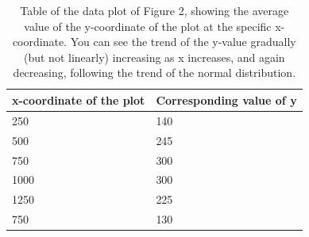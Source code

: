 \documentclass{article}
\begin{document}
\begin{table}
\centering
\begin{tabular}{ | m{2cm} || m{3cm}| } 
  \hline
  x-coordinate of the plot & Corresponding value of y \\
  \hline
  250 & 140 \\ 
  \hline
  500 & 245 \\ 
  \hline
  750 & 300 \\ 
  \hline
  1000 & 300 \\
  \hline
  1250 & 225 \\
  \hline
  750 & 130 \\
  \hline
\end{tabular}
\caption{Table of the data plot of Figure 2, showing the average value of the y-coordinate of the plot at the specific x-coordinate. You can see the trend of the y-value gradually (but not linearly) increasing as x increases, and again decreasing, following the trend of the normal distribution.}
\label{tab:my_label}
\end{table}



\nocite{*}
\end{document}
